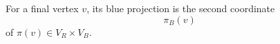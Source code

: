 \begin{definition}
For a final vertex \(v\), its blue projection is the second coordinate
\[
\pi_B(v)
\]
of \(\pi(v)\in V_R\times V_B\).
\end{definition}
